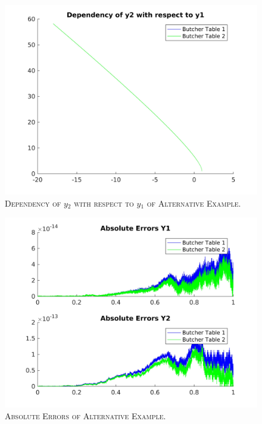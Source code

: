 \documentclass[a4paper,oneside]{book}
\numberwithin{equation}{chapter}
\begin{document}
\begin{figure}[H]
\centering
\includegraphics[scale=0.09]{3d}
\caption{\textsc{Dependency of $y_2$ with respect to $y_1$ of Alternative Example.}}
\end{figure}
\begin{figure}[H]
\centering
\includegraphics[scale=0.09]{3ae}
\caption{\textsc{Absolute Errors of Alternative Example.}}
\end{figure}
\end{document}

